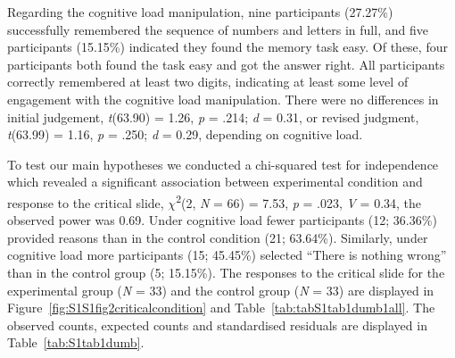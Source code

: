 \documentclass[
  american,
  man,floatsintext]{apa7}
\begin{document}
Regarding the cognitive load manipulation, nine participants (27.27\%) successfully remembered the sequence of numbers and letters in full, and five participants (15.15\%) indicated they found the memory task easy. Of these, four participants both found the task easy and got the answer right. All participants correctly remembered at least two digits, indicating at least some level of engagement with the cognitive load manipulation. There were no differences in initial judgement, \emph{t}(63.90) = 1.26, \emph{p} = .214; \emph{d} = 0.31, or revised judgment, \emph{t}(63.99) = 1.16, \emph{p} = .250; \emph{d} = 0.29, depending on cognitive load.

To test our main hypotheses we conducted a chi-squared test for independence which revealed a significant association between experimental condition and response to the critical slide, \(\chi\)\textsuperscript{2}(2, \emph{N} = 66) = 7.53, \emph{p} = .023, \emph{V} = 0.34, the observed power was 0.69. Under cognitive load fewer participants (12; 36.36\%) provided reasons than in the control condition (21; 63.64\%). Similarly, under cognitive load more participants (15; 45.45\%) selected \enquote{There is nothing wrong} than in the control group (5; 15.15\%). The responses to the critical slide for the experimental group (\emph{N} = 33) and the control group (\emph{N} = 33) are displayed in Figure~\ref{fig:S1S1fig2criticalcondition} and Table~\ref{tab:tabS1tab1dumb1all}. The observed counts, expected counts and standardised residuals are displayed in Table~\ref{tab:S1tab1dumb}.
\end{document}
